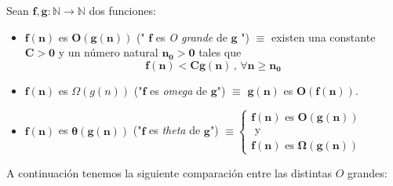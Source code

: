 \documentclass[twoside]{report}
\newcommand{\bs}[1]{\boldsymbol{#1}}
\begin{document}
 Sean $\bs{f,g:\mathbb{N}\rightarrow\mathbb{N}}$ dos funciones:

 \vspace{0.3cm}

 \begin{itemize}
   \item $\bs{f(n)}$ es $\bs{O(g(n))}$ (" $\bs{f}$ es \emph{O grande} de $\bs{g}$ ") $\bs{\equiv}$ existen una constante $\bs{C>0}$ y un n\'{u}mero natural $\bs{n_0>0}$ tales que $$\bs{f(n)<Cg(n)\,,\,\forall n\geq n_0}$$

   \vspace{0.3cm}

   \item $\bs{f(n)}$ es ${\Omega(g(n))}$ ("$\bs{f}$ es \emph{omega} de $\bs{g}$") $\bs{\equiv}$ $\bs{g(n)}$ es $\bs{O(f(n))}$.

   \vspace{0.3cm}

   \item $\bs{f(n)}$ es $\bs{\theta(g(n))}$ ("$\bs{f}$ es \emph{theta} de $\bs{g}$") $\bs{\equiv}
            \left\{\begin{array}{c}
                \bs{f(n)} \mbox{  es  } \bs{O(g(n))} \\
                \mbox{ y }\\
                \bs{f(n)} \mbox{  es  } \bs{\Omega(g(n))} \
            \end{array}\right.$
 \end{itemize}

\vspace{1.5cm}

%


 A continuación tenemos la siguiente comparación entre las distintas $O$ grandes:

 \vspace{0.4cm}
\end{document}
